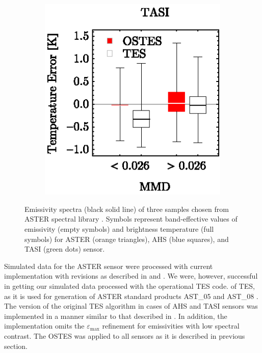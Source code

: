 \begin{figure}[!t]
\begin{subfigure}[t]{.3\linewidth}
		\caption{}
	\end{subfigure}
	\hspace{1em}
	\begin{subfigure}[t]{.3\linewidth}
		\centering
		\includegraphics[scale=1]{pics/Chapter_04/Simulated_data_TASI.eps}
		\caption{}
	\end{subfigure}
	\vspace{1.5 em}
	\caption{Emissivity spectra (black solid line) of three samples chosen from ASTER spectral library \cite{BH09}. Symbols represent band-effective values of emissivity (empty symbols) and brightness temperature (full symbols) for ASTER (orange triangles), AHS (blue squares), and TASI (green dots) sensor. }
	\label{fig:ResponseFunctions}
\end{figure}

Simulated data for the ASTER sensor were processed with current implementation with revisions as described in \cite{GG06} and \cite{SG09}. We were, however, successful in getting our simulated data processed with the operational TES code. of TES, as it is used for generation of ASTER standard products AST\_05 and AST\_08 \cite{B15}. The version of the original TES algorithm in cases of AHS and TASI sensors was implemented in a manner similar to that described in \cite{JS12}. In addition, the implementation omits the $\varepsilon_\mathrm{max}$ refinement for emissivities with low spectral contrast. The OSTES was applied to all sensors as it is described in previous section.

